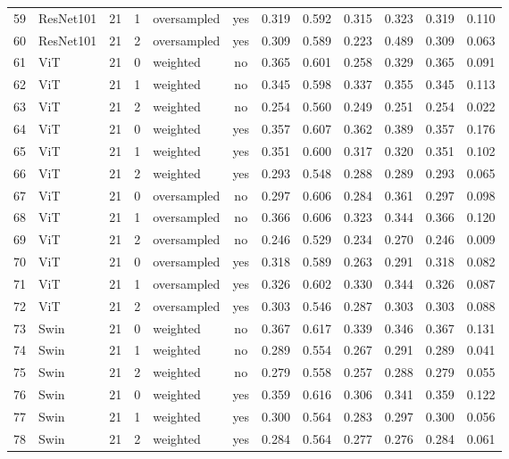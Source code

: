 \documentclass[a4paper,10pt]{book}
\begin{document}
\begin{scriptsize}
\begin{longtable}{@{}l l c c l c c c c c c c@{}}
        59 & ResNet101 & 21 & 1 & oversampled & yes & 0.319 & 0.592 & 0.315 & 0.323 & 0.319 & 0.110 \\ 
        60 & ResNet101 & 21 & 2 & oversampled & yes & 0.309 & 0.589 & 0.223 & 0.489 & 0.309 & 0.063 \\ 
        61 & ViT & 21 & 0 & weighted & no & 0.365 & 0.601 & 0.258 & 0.329 & 0.365 & 0.091 \\ 
        62 & ViT & 21 & 1 & weighted & no & 0.345 & 0.598 & 0.337 & 0.355 & 0.345 & 0.113 \\ 
        63 & ViT & 21 & 2 & weighted & no & 0.254 & 0.560 & 0.249 & 0.251 & 0.254 & 0.022 \\ 
        64 & ViT & 21 & 0 & weighted & yes & 0.357 & 0.607 & 0.362 & 0.389 & 0.357 & 0.176 \\ 
        65 & ViT & 21 & 1 & weighted & yes & 0.351 & 0.600 & 0.317 & 0.320 & 0.351 & 0.102 \\ 
        66 & ViT & 21 & 2 & weighted & yes & 0.293 & 0.548 & 0.288 & 0.289 & 0.293 & 0.065 \\ 
        67 & ViT & 21 & 0 & oversampled & no & 0.297 & 0.606 & 0.284 & 0.361 & 0.297 & 0.098 \\ 
        68 & ViT & 21 & 1 & oversampled & no & 0.366 & 0.606 & 0.323 & 0.344 & 0.366 & 0.120 \\ 
        69 & ViT & 21 & 2 & oversampled & no & 0.246 & 0.529 & 0.234 & 0.270 & 0.246 & 0.009 \\ 
        70 & ViT & 21 & 0 & oversampled & yes & 0.318 & 0.589 & 0.263 & 0.291 & 0.318 & 0.082 \\ 
        71 & ViT & 21 & 1 & oversampled & yes & 0.326 & 0.602 & 0.330 & 0.344 & 0.326 & 0.087 \\ 
        72 & ViT & 21 & 2 & oversampled & yes & 0.303 & 0.546 & 0.287 & 0.303 & 0.303 & 0.088 \\ 
        73 & Swin & 21 & 0 & weighted & no & 0.367 & 0.617 & 0.339 & 0.346 & 0.367 & 0.131 \\ 
        74 & Swin & 21 & 1 & weighted & no & 0.289 & 0.554 & 0.267 & 0.291 & 0.289 & 0.041 \\ 
        75 & Swin & 21 & 2 & weighted & no & 0.279 & 0.558 & 0.257 & 0.288 & 0.279 & 0.055 \\ 
        76 & Swin & 21 & 0 & weighted & yes & 0.359 & 0.616 & 0.306 & 0.341 & 0.359 & 0.122 \\ 
        77 & Swin & 21 & 1 & weighted & yes & 0.300 & 0.564 & 0.283 & 0.297 & 0.300 & 0.056 \\ 
        78 & Swin & 21 & 2 & weighted & yes & 0.284 & 0.564 & 0.277 & 0.276 & 0.284 & 0.061 \\ 

\end{longtable}
\end{scriptsize}
\end{document}
